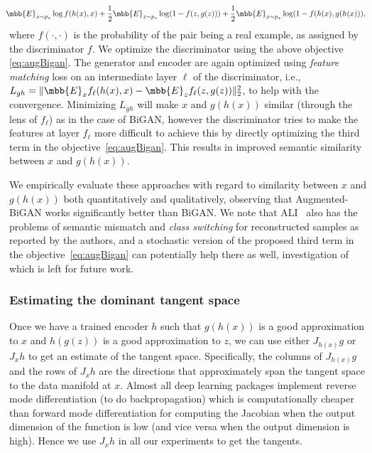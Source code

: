 \documentclass{article}
\begin{document}
\begin{itemize}[noitemsep,topsep=0pt,parsep=0pt,partopsep=0pt,leftmargin=*]
\begin{align}
\hspace{-2mm} \mbb{E}_{x\sim p_x} \log f(h(x),x) + \frac{1}{2}\mbb{E}_{z\sim p_z} \log (1-f(z,g(z))) + \frac{1}{2} \mbb{E}_{x\sim p_x} \log(1-f(h(x),g(h(x))),
\label{eq:augBigan}
\end{align}
where $f(\cdot,\cdot)$ is the probability of the pair being a real example, as assigned by the discriminator $f$. We optimize the discriminator using the above objective \eqref{eq:augBigan}. The generator and encoder are again optimized using \emph{feature matching} \cite{salimans2016improved} loss on an intermediate layer $\ell$ of the discriminator, i.e., $L_{gh} = \lVert \mbb{E}_x f_{\ell}(h(x),x) - \mbb{E}_z f_{\ell}(z,g(z))\rVert_2^2$, to help with the convergence. Minimizing $L_{gh}$ will make $x$ and $g(h(x))$ similar (through the lens of $f_{\ell}$) as in the case of BiGAN, however the discriminator tries to make the features at layer $f_{\ell}$ more difficult to achieve this by directly optimizing the third term in the objective~\eqref{eq:augBigan}. This results in improved semantic similarity between $x$ and $g(h(x))$.

\end{itemize}

We empirically evaluate these approaches with regard to similarity between $x$ and $g(h(x))$ both quantitatively and qualitatively, observing that Augmented-BiGAN works significantly better than BiGAN. We note that ALI~\cite{dumoulin2016adversarially} also has the problems of semantic mismatch and \emph{class switching} for reconstructed samples as reported by the authors, and a stochastic version of the proposed third term in the objective~\eqref{eq:augBigan} can potentially help there as well, investigation of which is left for future work.

\subsubsection{Estimating the dominant tangent space}
Once we have a trained encoder $h$ such that $g(h(x))$ is a good approximation to $x$ and $h(g(z))$ is a good approximation to $z$, we can use either $J_{h(x)} g$ or $J_xh$ to get an estimate of the tangent space. Specifically, the columns of $J_{h(x)} g$ and the rows of $J_x h$ are the directions that approximately span the tangent space to the data manifold at $x$. Almost all deep learning packages %
implement reverse mode differentiation (to do backpropagation) which is computationally cheaper than forward mode differentiation for computing the Jacobian when the output dimension of the function is low (and vice versa when the output dimension is high). Hence we use $J_{x}h$ in all our experiments to get the tangents.
\end{document}
